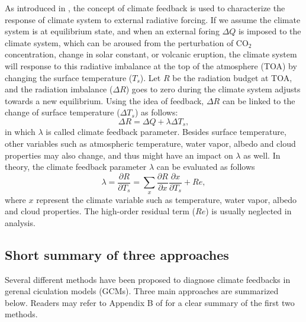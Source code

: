As introduced in , 
the concept of climate feedback is used to characterize the response of climate system to external radiative forcing. If we assume the climate system is at equilibrium state, and when an external foring $\Delta Q$ is imposed to the climate system, which can be aroused from the perturbation of CO$_2$ concentration, change in solar constant, or volcanic eruption, the climate system will response to this radiative imbalance at the top of the atmosphere (TOA) by changing the surface temperature ($T_s$). Let $R$ be the radiation budget at TOA, and the radiation imbalance ($\Delta R$) goes to zero during the climate system adjusts towards a new equilibrium. Using the idea of feedback, $\Delta R$ can be linked to the change of surface temperature ($\Delta T_s$) as follows:
\begin{equation}
    \Delta R = \Delta Q + \lambda \Delta T_s,
    \label{eq:imbalance_forcing_lambda}
\end{equation}
in which $\lambda$ is called climate feedback parameter. Besides surface temperature, other variables such as atmospheric temperature, water vapor, albedo and cloud properties may also change, and thus might have an impact on $\lambda$ as well. In theory, the climate feedback parameter $\lambda$ can be evaluated as follows
\begin{equation}
    \lambda = \frac{\partial R}{\partial T_s} = \sum_x \frac{\partial R}{\partial x}\frac{\partial x}{\partial T_s}  + Re, %
    \label{eq:lambda}
\end{equation}
where $x$ represent the climate variable such as temperature, water vapor, albedo and cloud properties. The high-order residual term ($Re$) is usually neglected in analysis.

\subsection{Short summary of three approaches}
\label{sec:three_climate_fbk_methods}

Several different methods have been proposed to diagnose climate feedbacks in gerenal ciculation models (GCMs). Three main approaches are summarized below. Readers may refer to Appendix B of \cite{Bony2006} for a clear summary of the first two methods.%

